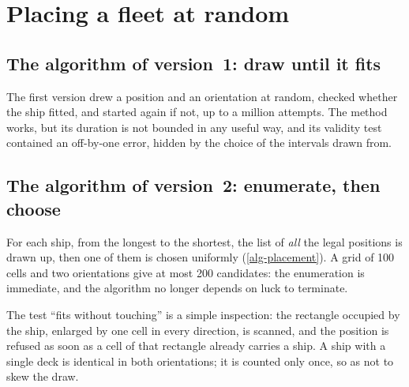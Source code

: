 \section{Placing a fleet at random}

\subsection{The algorithm of version~1: draw until it fits}

The first version drew a position and an orientation at random, checked whether the ship
fitted, and started again if not, up to a million attempts. The method works, but its
duration is not bounded in any useful way, and its validity test contained an off-by-one
error, hidden by the choice of the intervals drawn from.

\subsection{The algorithm of version~2: enumerate, then choose}

For each ship, from the longest to the shortest, the list of \emph{all} the legal positions
is drawn up, then one of them is chosen uniformly (\cref{alg-placement}). A grid of 100 cells
and two orientations give at most 200 candidates: the enumeration is immediate, and the
algorithm no longer depends on luck to terminate.

\begin{algorithm}[ht]
    \caption{Random placement of a fleet}
    \label{alg-placement}
\end{algorithm}

The test \enquote{fits without touching} is a simple inspection: the rectangle occupied by
the ship, enlarged by one cell in every direction, is scanned, and the position is refused as
soon as a cell of that rectangle already carries a ship. A ship with a single deck is
identical in both orientations; it is counted only once, so as not to skew the draw.

